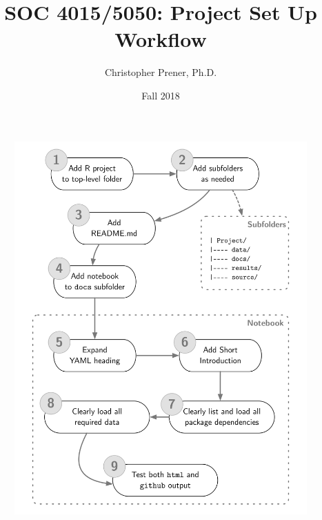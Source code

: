 \documentclass{tufte-handout}
\title{SOC 4015/5050: Project Set Up Workflow}
\author{Christopher Prener, Ph.D.}
\date{Fall 2018}
\begin{document}
\maketitle %

\begin{fullwidth}
\begin{figure}[!h]
\includegraphics[scale=.70]{"project"}
\end{figure}
\end{fullwidth}

\end{document}
